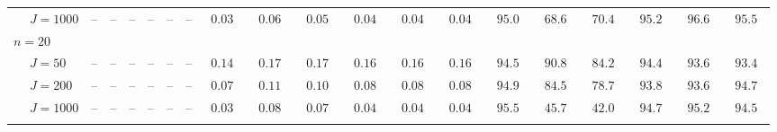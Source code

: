 \begin{sidewaystable}
\begin{threeparttable}
\begin{tabular}{llcccccccccccccccccc}
 & \nopagebreak $\;J=1000$  & \phantom{00}--\phantom{00} & \phantom{00}--\phantom{00} & \phantom{00}--\phantom{00} & \phantom{00}--\phantom{00} & \phantom{00}--\phantom{00} & \phantom{00}--\phantom{00} & $\phantom{0}0.03\phantom{0}$ & $\phantom{0}0.06\phantom{0}$ & $\phantom{0}0.05\phantom{0}$ & $\phantom{0}0.04\phantom{0}$ & $\phantom{0}0.04\phantom{0}$ & $\phantom{0}0.04\phantom{0}$ & $\phantom{0}95.0\phantom{0}$ & $\phantom{0}68.6\phantom{0}$ & $\phantom{0}70.4\phantom{0}$ & $\phantom{0}95.2\phantom{0}$ & $\phantom{0}96.6\phantom{0}$ & $\phantom{0}95.5\phantom{0}$ \\
\multicolumn{4}{l}{$n=20$} \\  & \nopagebreak $\;J=50$  & \phantom{00}--\phantom{00} & \phantom{00}--\phantom{00} & \phantom{00}--\phantom{00} & \phantom{00}--\phantom{00} & \phantom{00}--\phantom{00} & \phantom{00}--\phantom{00} & $\phantom{0}0.14\phantom{0}$ & $\phantom{0}0.17\phantom{0}$ & $\phantom{0}0.17\phantom{0}$ & $\phantom{0}0.16\phantom{0}$ & $\phantom{0}0.16\phantom{0}$ & $\phantom{0}0.16\phantom{0}$ & $\phantom{0}94.5\phantom{0}$ & $\phantom{0}90.8\phantom{0}$ & $\phantom{0}84.2\phantom{0}$ & $\phantom{0}94.4\phantom{0}$ & $\phantom{0}93.6\phantom{0}$ & $\phantom{0}93.4\phantom{0}$ \\
 & \nopagebreak $\;J=200$  & \phantom{00}--\phantom{00} & \phantom{00}--\phantom{00} & \phantom{00}--\phantom{00} & \phantom{00}--\phantom{00} & \phantom{00}--\phantom{00} & \phantom{00}--\phantom{00} & $\phantom{0}0.07\phantom{0}$ & $\phantom{0}0.11\phantom{0}$ & $\phantom{0}0.10\phantom{0}$ & $\phantom{0}0.08\phantom{0}$ & $\phantom{0}0.08\phantom{0}$ & $\phantom{0}0.08\phantom{0}$ & $\phantom{0}94.9\phantom{0}$ & $\phantom{0}84.5\phantom{0}$ & $\phantom{0}78.7\phantom{0}$ & $\phantom{0}93.8\phantom{0}$ & $\phantom{0}93.6\phantom{0}$ & $\phantom{0}94.7\phantom{0}$ \\
 & \nopagebreak $\;J=1000$  & \phantom{00}--\phantom{00} & \phantom{00}--\phantom{00} & \phantom{00}--\phantom{00} & \phantom{00}--\phantom{00} & \phantom{00}--\phantom{00} & \phantom{00}--\phantom{00} & $\phantom{0}0.03\phantom{0}$ & $\phantom{0}0.08\phantom{0}$ & $\phantom{0}0.07\phantom{0}$ & $\phantom{0}0.04\phantom{0}$ & $\phantom{0}0.04\phantom{0}$ & $\phantom{0}0.04\phantom{0}$ & $\phantom{0}95.5\phantom{0}$ & $\phantom{0}45.7\phantom{0}$ & $\phantom{0}42.0\phantom{0}$ & $\phantom{0}94.7\phantom{0}$ & $\phantom{0}95.2\phantom{0}$ & $\phantom{0}94.5\phantom{0}$ \\
[0.5ex]\hline\\[-1.6ex] 

\end{tabular}
\end{threeparttable}
\end{sidewaystable}
